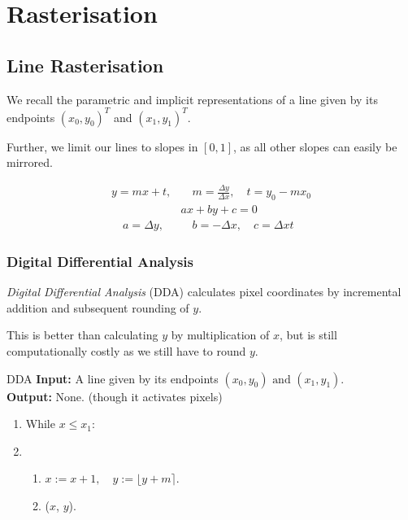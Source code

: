 \documentclass{panikzettel}
\begin{document}
\section{Rasterisation}

\subsection{Line Rasterisation}

\begin{halfboxl}
We recall the parametric and implicit representations of a line given by its endpoints $(x_0,y_0)^T$ and $(x_1,y_1)^T$.

Further, we limit our lines to slopes in $[0,1]$, as all other slopes can easily be mirrored.

\end{halfboxl}%
\begin{halfboxr}
\vspace{-\baselineskip}
\begin{align*}
    y = mx + t, & \quad m = \frac{\Delta y}{\Delta x}, \quad t = y_0 - mx_0  \\
    & ax + by + c = 0 \\
    \quad a = \Delta y, & \quad b =-\Delta x, \quad c = \Delta x t
\end{align*}
\end{halfboxr}


\begin{halfboxl}
\vspace{-\baselineskip}
\subsubsection*{Digital Differential Analysis}

\emph{Digital Differential Analysis} (DDA) calculates pixel coordinates by incremental addition and subsequent rounding of $y$.

This is better than calculating $y$ by multiplication of $x$, but is still computationally costly as we still have to round $y$.
\end{halfboxl}%
\begin{halfboxr}
\vspace{-\baselineskip}
\begin{algo}{DDA}
\textbf{Input:} A line given by its endpoints $(x_0,y_0) \text{ and } (x_1,y_1)$. \\
\textbf{Output:} None. (though it activates pixels)
\tcblower
\begin{enumerate}
    \item While $x \le x_1$:
    \item   \begin{enumerate}
                \item $x := x + 1, \quad y := \lfloor y + m \rceil$.
                \item {}($x$, $y$).
            \end{enumerate}
\end{enumerate}
\end{algo}
\end{halfboxr}
\end{document}
